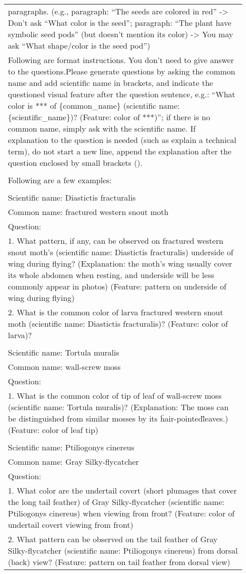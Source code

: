 \begin{longtable}{p{0.95\linewidth}}
paragraphs. (e.g., paragraph: ``The seeds are colored in red'' -> Don't ask ``What color is the seed''; paragraph: ``The plant have symbolic seed pods'' (but doesn't mention its color) -> You may ask ``What shape/color is the seed pod'')\\Following are format instructions. You don't need to give answer to the questions.Please generate questions by asking the common name and add scientific name in brackets, and indicate the questioned visual feature after the question sentence, e.g.: ``What color is *** of \{common\_name\} (scientific name: \{scientific\_name\})? (Feature: color of ***)''; if there is no common name, simply ask with the scientific name. If explanation to the question is needed (such as explain a technical term), do not start a new line, append the explanation after the question enclosed by small brackets ().\\\\
Following are a few examples:
\\\\Scientific name: Diastictis fracturalis\\Common name: fractured western snout moth\\Question:\\1. What pattern, if any, can be observed on fractured western snout moth's (scientific name: Diastictis fracturalis) underside of wing during flying? (Explanation: the moth's wing usually cover its whole abdomen when resting, and underside will be less commonly appear in photos) (Feature: pattern on underside of wing during flying)\\2. What is the common color of larva fractured western snout moth (scientific name: Diastictis fracturalis)? (Feature: color of larva)?
\\\\Scientific name: Tortula muralis\\Common name: wall-screw moss\\Question:\\1. What is the common color of tip of leaf of wall-screw moss (scientific name: Tortula muralis)? (Explanation: The moss can be distinguished from similar mosses by its \"hair-pointed\" leaves.) (Feature: color of leaf tip)
\\\\Scientific name: Ptiliogonys cinereus\\Common name: Gray Silky-flycatcher\\Question:\\1. What color are the undertail covert (short plumages that cover the long tail feather) of Gray Silky-flycatcher (scientific name: Ptiliogonys cinereus) when viewing from front? (Feature: color of undertail covert viewing from front)\\2. What pattern can be observed on the tail feather of Gray Silky-flycatcher (scientific name: Ptiliogonys cinereus) from dorsal (back) view? (Feature: pattern on tail feather from dorsal view)


\end{longtable}
